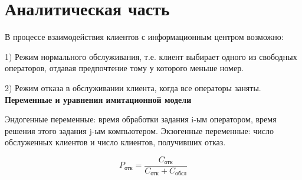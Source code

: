 \documentclass[14pt, a4paper]{extarticle}
\begin{document}
	
	\begin{figure}[h!]
	\end{figure}
	
	\clearpage
	\section*{Аналитическая часть}
	В процессе взаимодействия клиентов с информационным центром возможно:
	
	1) Режим нормального обслуживания, т.е. клиент выбирает одного из свободных операторов, отдавая предпочтение тому у которого меньше номер.
	
	2) Режим отказа в обслуживании клиента, когда все операторы заняты. 
	\textbf{Переменные и уравнения имитационной модели }\par
	Эндогенные переменные: время обработки задания i-ым оператором, время решения этого задания j-ым компьютером.
	Экзогенные переменные: число обслуженных клиентов и число клиентов, получивших отказ.
	
	\begin{figure}[h!]
	\end{figure}
	
	\begin{equation*}
		P_{\text{отк}} = \frac{C_{\text{отк}}}{C_{\text{отк}} + C_{\text{обсл}}}
	\end{equation*}
	
\end{document}
